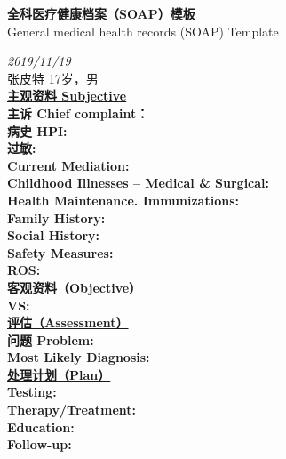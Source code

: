 \documentclass[UTF8,a4paper,12pt]{article}
\begin{document}
    \begin{center}
        \large{\textbf{全科医疗健康档案（SOAP）模板}} \\ 
        \normalsize{General medical health records (SOAP) Template}
    \end{center}
    
    \begin{flushleft}
        \emph{2019/11/19} \\ {张皮特 17岁，男} \\[14pt]
        \textbf{\underline{主观资料 Subjective}} \\
        \textbf{主诉 Chief complaint：} \\
        \textbf{病史 HPI:} \\
        \textbf{过敏:} \\
        \textbf{Current Mediation:} \\
        \textbf{Childhood Illnesses – Medical \& Surgical:} \\
        \textbf{Health Maintenance. Immunizations:} \\
        \textbf{Family History:} \\
        \textbf{Social History:} \\
        \textbf{Safety Measures:} \\
        \textbf{ROS:} \\[14pt]
        
        \textbf{\underline{客观资料（Objective）}} \\
        \textbf{VS:} \\[14pt]

        \textbf{\underline{评估（Assessment）}} \\
        \textbf{问题 Problem:} \\
        \textbf{Most Likely Diagnosis:} \\[14pt]
        
        \textbf{\underline{处理计划（Plan）}} \\
        \textbf{Testing:} \\
        \textbf{Therapy/Treatment:} \\
        \textbf{Education:} \\
        \textbf{Follow-up:} \\[14pt]
    \end{flushleft}
\end{document}
